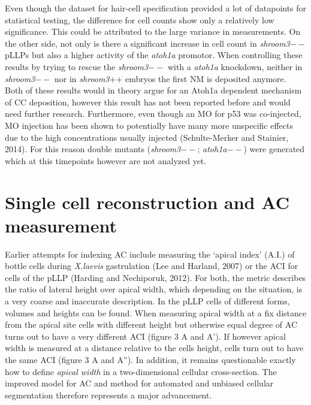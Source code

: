 \documentclass[11pt,singlespacinge,twoside]{reedthesis} %
\begin{document}
Even though the dataset for hair-cell specification provided a lot of datapoints for statistical testing, the difference for cell counts show only a relatively low significance. This could be attributed to the large variance in measurements. On the other side, not only is there a significant increase in cell count in \emph{shroom3}\(--\) pLLPs but also a higher activity of the \emph{atoh1a} promotor. When controlling these results by trying to rescue the \emph{shroom3}\(--\) with a \emph{atoh1a} knockdown, neither in \emph{shroom3}\(--\) nor in \emph{shroom3}++ embryos the first NM is deposited anymore. Both of these results would in theory argue for an Atoh1a dependent mechanism of CC deposition, however this result has not been reported before and would need further research. Furthermore, even though an MO for p53 was co-injected, MO injection has been shown to potentially have many more unspecific effects due to the high concentrations usually injected (Schulte-Merker and Stainier, 2014). For this reason double mutants (\emph{shroom3}\(--\); \emph{atoh1a}\(--\)) were generated which at this timepoints however are not analyzed yet.

\hypertarget{single-cell-reconstruction-and-ac-measurement}{%
\section{Single cell reconstruction and AC measurement}\label{single-cell-reconstruction-and-ac-measurement}}

Earlier attempts for indexing AC include measuring the `apical index' (A.I.) of bottle cells during \emph{X.laevis} gastrulation (Lee and Harland, 2007) or the ACI for cells of the pLLP (Harding and Nechiporuk, 2012). For both, the metric describes the ratio of lateral height over apical width, which depending on the situation, is a very coarse and inaccurate description. In the pLLP cells of different forms, volumes and heights can be found. When measuring apical width at a fix distance from the apical site cells with different height but otherwise equal degree of AC turns out to have a very different ACI (figure 3 A and A'). If however apical width is measured at a distance relative to the cells height, cells turn out to have the same ACI (figure 3 A and A''). In addition, it remains questionable exactly how to define \emph{apical width} in a two-dimensional cellular cross-section. The improved model for AC and method for automated and unbiased cellular segmentation therefore represents a major advancement.
\end{document}
